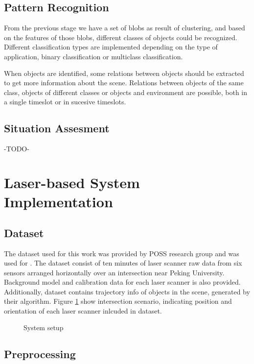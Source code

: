 \documentclass[10pt,twocolumn,letterpaper]{article}
\begin{document}
\subsection{Pattern Recognition}

From the previous stage we have a set of blobs as result of clustering, and based on the features of those blobs, different classes of objects could be recognized. Different classification types are implemented depending on the type of application, binary classification or multiclass classification.

When objects are identified, some relations between objects should be extracted to get more information about the scene. Relations between objects of the same class, objects of different classes or objects and environment are possible, both in a single timeslot or in sucesive timeslots. 

\subsection{Situation Assesment}

-TODO-

\section{Laser-based System Implementation}

\subsection{Dataset}
 The dataset used for this work was provided by POSS research group and was used for \cite{Zhao2009}. The dataset consist of ten minutes of laser scanner raw data from six sensors arranged horizontally over an intersection near Peking University. Background model and calibration data for each laser scanner is also provided. Additionally, dataset contains trajectory info of objects in the scene, generated by their algorithm. Figure \ref{inter_cfg} show intersection scenario, indicating position and orientation of each laser scanner inlcuded in dataset.

\begin{figure}
    \centering
    
    \caption{System setup}
    \label{inter_cfg}
\end{figure}
 

 
\subsection{Preprocessing}
\end{document}
